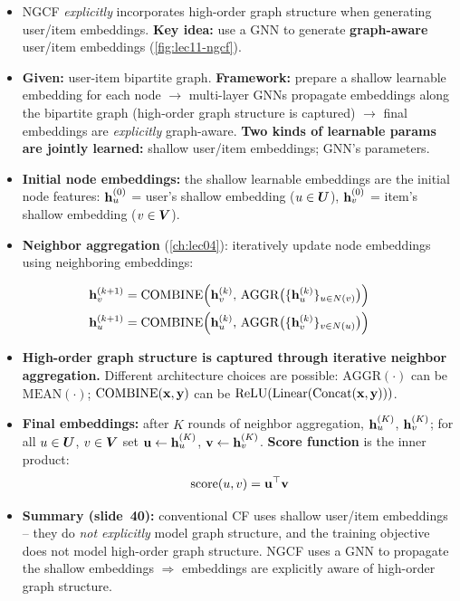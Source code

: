 \begin{itemize}
  \item NGCF \emph{explicitly} incorporates high-order graph structure when
    generating user/item embeddings. \textbf{Key idea:} use a GNN to generate
    \textbf{graph-aware} user/item embeddings (\cref{fig:lec11-ngcf}).
  \item \textbf{Given:} user-item bipartite graph. \textbf{Framework:} prepare
    a shallow learnable embedding for each node $\to$ multi-layer GNNs
    propagate embeddings along the bipartite graph (high-order graph structure
    is captured) $\to$ final embeddings are \emph{explicitly} graph-aware.
    \textbf{Two kinds of learnable params are jointly learned:} shallow
    user/item embeddings; GNN's parameters.
  \item \textbf{Initial node embeddings:} the shallow learnable embeddings are
    the initial node features: $\mathbf{h}_u^{(0)}$ = user's shallow embedding
    ($u\in\bm{U}$), $\mathbf{h}_v^{(0)}$ = item's shallow embedding ($v\in\bm{V}$).
  \item \textbf{Neighbor aggregation} (\cref{ch:lec04}): iteratively update
    node embeddings using neighboring embeddings:
\end{itemize}
\begin{align}
  \mathbf{h}_v^{(k+1)} &= \mathrm{COMBINE}\Big(\mathbf{h}_v^{(k)},\,
    \mathrm{AGGR}\big(\{\mathbf{h}_u^{(k)}\}_{u\in N(v)}\big)\Big)
    \label{eq:lec11-ngcf-item}\\
  \mathbf{h}_u^{(k+1)} &= \mathrm{COMBINE}\Big(\mathbf{h}_u^{(k)},\,
    \mathrm{AGGR}\big(\{\mathbf{h}_v^{(k)}\}_{v\in N(u)}\big)\Big)
    \label{eq:lec11-ngcf-user}
\end{align}
\begin{itemize}
  \item \textbf{High-order graph structure is captured through iterative
    neighbor aggregation.} Different architecture choices are possible:
    $\mathrm{AGGR}(\cdot)$ can be $\mathrm{MEAN}(\cdot)$;
    $\mathrm{COMBINE}(\mathbf{x},\mathbf{y})$ can be
    $\mathrm{ReLU}(\mathrm{Linear}(\mathrm{Concat}(\mathbf{x},\mathbf{y})))$.
  \item \textbf{Final embeddings:} after $K$ rounds of neighbor aggregation,
    $\mathbf{h}_u^{(K)}$, $\mathbf{h}_v^{(K)}$; for all $u\in\bm{U}$, $v\in\bm{V}$ set
    $\mathbf{u}\leftarrow\mathbf{h}_u^{(K)}$, $\mathbf{v}\leftarrow\mathbf{h}_v^{(K)}$. \textbf{Score
    function} is the inner product:
    \begin{equation}\label{eq:lec11-ngcf-score}
      \mathrm{score}(u,v)=\mathbf{u}^{\top}\mathbf{v}
    \end{equation}
  \item \textbf{Summary (slide~40):} conventional CF uses shallow user/item
    embeddings -- they do \emph{not explicitly} model graph structure, and the
    training objective does not model high-order graph structure. NGCF uses a
    GNN to propagate the shallow embeddings $\Rightarrow$ embeddings are
    explicitly aware of high-order graph structure.
\end{itemize}

